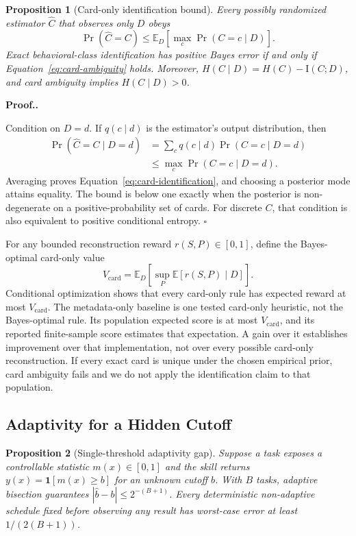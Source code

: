 \documentclass[letterpaper,twocolumn,10pt]{article}
\newtheorem{proposition}{Proposition}[section]
\newcommand{\paragraphtitle}[1]{%
  \vspace{5pt}\noindent\textbf{#1.}%
}
\begin{document}
\begin{proposition}[Card-only identification bound]
\label{prop:card}
Every possibly randomized estimator $\widehat C$ that observes only $D$ obeys
\begin{equation}
  \Pr(\widehat C=C)
  \le \mathbb{E}_D\!\left[\max_c\Pr(C=c\mid D)\right].
  \label{eq:card-identification}
\end{equation}
Exact behavioral-class identification has positive Bayes error if and only if
Equation~\ref{eq:card-ambiguity} holds.  Moreover,
$H(C\mid D)=H(C)-\mathrm{I}(C;D)$, and card ambiguity implies $H(C\mid D)>0$.
\end{proposition}

\paragraphtitle{Proof.}
Condition on $D=d$.  If $q(c\mid d)$ is the estimator's output distribution,
then
\begin{align*}
  \Pr(\widehat C=C\mid D=d)
    &=\sum_c q(c\mid d)\Pr(C=c\mid D=d)\\
    &\le\max_c\Pr(C=c\mid D=d).
\end{align*}
Averaging proves Equation~\ref{eq:card-identification}, and choosing a posterior
mode attains equality.  The bound is below one exactly when the posterior is
non-degenerate on a positive-probability set of cards.  For discrete $C$, that
condition is also equivalent to positive conditional entropy.  \hfill$\square$

For any bounded reconstruction reward $r(S,P)\in[0,1]$, define the Bayes-optimal
card-only value
\[
  V_{\mathrm{card}}
  =\mathbb{E}_D\!\left[\sup_P\mathbb{E}[r(S,P)\mid D]\right].
\]
Conditional optimization shows that every card-only rule has expected reward at
most $V_{\mathrm{card}}$.  The metadata-only baseline is one tested card-only
heuristic, not the Bayes-optimal rule.  Its population expected score is at most
$V_{\mathrm{card}}$, and its reported finite-sample score estimates that
expectation.  A gain over it establishes improvement over that implementation,
not over every possible card-only reconstruction.  If every exact card is unique
under the chosen empirical prior, card ambiguity fails and we do not apply the
identification claim to that population.

\subsection{Adaptivity for a Hidden Cutoff}

\begin{proposition}[Single-threshold adaptivity gap]
\label{prop:adaptivity}
Suppose a task exposes a controllable statistic $m(x)\in[0,1]$ and the skill
returns $y(x)=\mathbf{1}[m(x)\ge b]$ for an unknown cutoff $b$.  With $B$ tasks,
adaptive bisection guarantees $|\widehat b-b|\le2^{-(B+1)}$.  Every deterministic
non-adaptive schedule fixed before observing any result has worst-case error at
least $1/(2(B+1))$.
\end{proposition}
\end{document}
